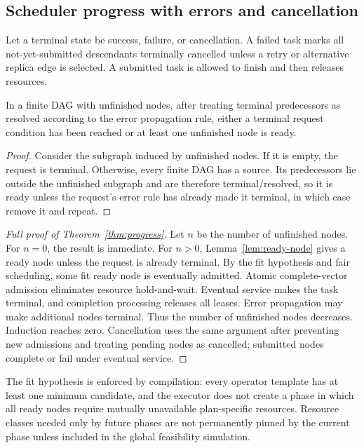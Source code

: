 \subsection{Scheduler progress with errors and cancellation}

Let a terminal state be success, failure, or cancellation. A failed task marks all not-yet-submitted descendants terminally cancelled unless a retry or alternative replica edge is selected. A submitted task is allowed to finish and then releases resources.

\begin{lemma}
\label{lem:ready-node}
In a finite DAG with unfinished nodes, after treating terminal predecessors as resolved according to the error propagation rule, either a terminal request condition has been reached or at least one unfinished node is ready.
\end{lemma}

\begin{proof}
Consider the subgraph induced by unfinished nodes. If it is empty, the request is terminal. Otherwise, every finite DAG has a source. Its predecessors lie outside the unfinished subgraph and are therefore terminal/resolved, so it is ready unless the request's error rule has already made it terminal, in which case remove it and repeat.
\end{proof}

\begin{proof}[Full proof of Theorem~\ref{thm:progress}]
Let $n$ be the number of unfinished nodes. For $n=0$, the result is immediate. For $n>0$, Lemma~\ref{lem:ready-node} gives a ready node unless the request is already terminal. By the fit hypothesis and fair scheduling, some fit ready node is eventually admitted. Atomic complete-vector admission eliminates resource hold-and-wait. Eventual service makes the task terminal, and completion processing releases all leases. Error propagation may make additional nodes terminal. Thus the number of unfinished nodes decreases. Induction reaches zero. Cancellation uses the same argument after preventing new admissions and treating pending nodes as cancelled; submitted nodes complete or fail under eventual service.
\end{proof}

The fit hypothesis is enforced by compilation: every operator template has at least one minimum candidate, and the executor does not create a phase in which all ready nodes require mutually unavailable plan-specific resources. Resource classes needed only by future phases are not permanently pinned by the current phase unless included in the global feasibility simulation.


